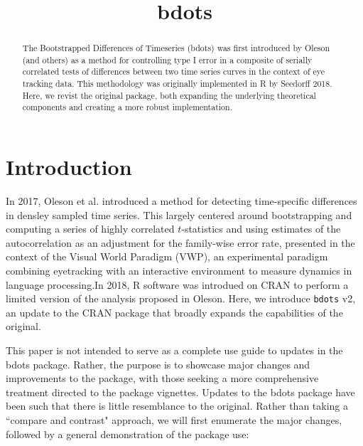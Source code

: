 \documentclass{article}
\title{bdots}
\date{}
\begin{document}

\maketitle

%

\begin{abstract}
The Bootstrapped Differences of Timeseries (bdots) was first introduced by Oleson (and others) as a method for controlling type I error in a composite of serially correlated tests of differences between two time series curves in the context of eye tracking data.  This methodology was originally implemented in R by Seedorff 2018. Here, we revist the original package, both expanding the underlying theoretical components and creating a more robust implementation.
\end{abstract}


\section{Introduction}

In 2017, Oleson et al. introduced a method for detecting time-specific differences in densley sampled time series. This largely centered around bootstrapping and computing a series of highly correlated $t$-statistics and using estimates of the autocorrelation as an adjustment for the family-wise error rate, presented in the context of the Visual World Paradigm (VWP), an experimental paradigm combining eyetracking with an interactive environment to measure dynamics in language processing.In 2018, R software was introdued on CRAN to perform a limited version of the analysis proposed in Oleson. Here, we introduce \texttt{bdots} v2, an update to the CRAN package that broadly expands the capabilities of the original. 

This paper is not intended to serve as a complete use guide to updates in the bdots package. Rather, the purpose is to showcase major changes and improvements to the package, with those seeking a more comprehensive treatment directed to the package vignettes. Updates to the bdots package have been such that there is little resemblance to the original. Rather than taking a ``compare and contrast" approach, we will first enumerate the major changes, followed by a general demonstration of the package use:
\end{document}
